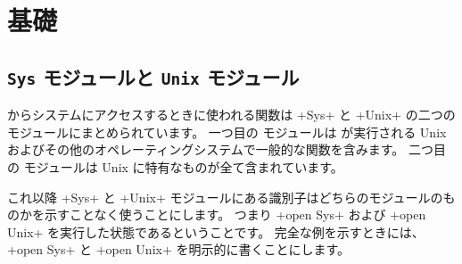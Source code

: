 %
%

\chapter{{基礎}}

\section{{\normalfont\texttt{Sys}} モジュールと {\normalfont\texttt{Unix} モジュール}}

\ocaml からシステムにアクセスするときに使われる関数は \ml+Sys+ と \ml+Unix+ の二つのモジュールにまとめられています。
一つ目の  モジュールは \ocaml が実行される Unix
およびその他のオペレーティングシステムで一般的な関数を含みます。
二つ目の  モジュールは Unix に特有なものが全て含まれています。

これ以降 \ml+Sys+ と \ml+Unix+ モジュールにある識別子はどちらのモジュールのものかを示すことなく使うことにします。
つまり \ml+open Sys+ および \ml+open Unix+ を実行した状態であるということです。
完全な例を示すときには、\ml+open Sys+ と \ml+open Unix+ を明示的に書くことにします。

